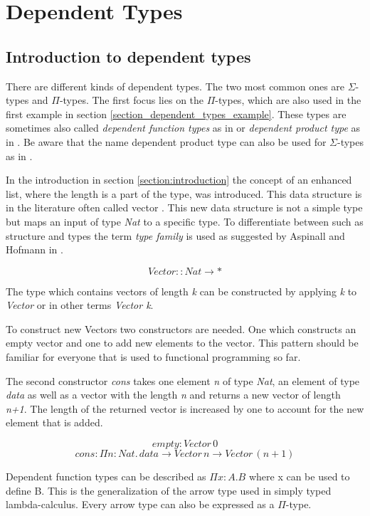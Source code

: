 \section{Dependent Types}
\subsection{Introduction to dependent types}
There are different kinds of dependent types. The two most common ones are $\Sigma$-types and $\Pi$-types.
The first focus lies on the $\Pi$-types, which are also used in the first example in section \ref{section_dependent_types_example}. These types are sometimes also called \emph{dependent function types} as in \cite{10.1145/2841316} or \emph{dependent product type} as in \cite{10.5555/1076265}. Be aware that the name dependent product type can also be used for $\Sigma$-types as in \cite{10.1145/2841316}.

In the introduction in section \ref{section:introduction} the concept of an enhanced list, where the length is a part of the type, was introduced.
This data structure is in the literature often called vector \cite{10.1145/2841316} \cite{10.5555/1076265}.
This new data structure is not a simple type but maps an input of type \emph{Nat} to a specific type. To differentiate between such as structure and types the term \emph{type family} is used as suggested by Aspinall and Hofmann in \cite{10.5555/1076265}.

$$Vector :: Nat \rightarrow *$$

The type which contains vectors of length \emph{k} can be constructed by applying \emph{k} to \emph{Vector} or in other terms \emph{Vector k}.

To construct new Vectors two constructors are needed. 
One which constructs an empty vector and one to add new elements to the vector. 
This pattern should be familiar for everyone that is used to functional programming so far.

The second constructor \emph{cons} takes one element \emph{n} of type \emph{Nat}, an element of type \emph{data} as well as a vector with the length \emph{n} and returns a new vector of length \emph{n+1}. 
The length of the returned vector is increased by one to account for the new element that is added.

$$empty: Vector \, 0$$
$$cons : \Pi n : Nat. \, data \rightarrow Vector \, n \rightarrow Vector \, (n+1)$$

Dependent function types can be described as $\Pi x : A. B$ where x can be used to define B. 
This is the generalization of the arrow type used in simply typed lambda-calculus. Every arrow type can also be expressed as a $\Pi$-type.

